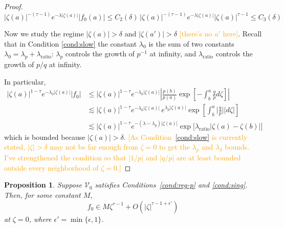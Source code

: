 \documentclass{article}
\theoremstyle{plain}
\newtheorem{prop}{Proposition}
\newcommand{\hardpart}{\mathcal{V}_0}
\newcommand{\solproto}{f_0}
\begin{document}
\begin{proof}
\[   |\zeta(a)|^{-(\tau-1)} e^{-\lambda |\zeta(a)|} |f_0(a)|\leq  C_2(\delta)\, |\zeta(a)|^{-(\tau-1)} e^{-\lambda |\zeta(a)|} |\zeta(a)|^{\tau-1} \leq C_3(\delta)
\]

Now we study the regime $|\zeta(a)|>\delta$ and $|\zeta(a')|>\delta$ \textcolor{orange}{[there's no $a'$ here]}. Recall that in Condition \eqref{cond:slow} the constant $\lambda_0$ is the sum of two constants $\lambda_0=\lambda_p+\lambda_\text{ratio}$: $\lambda_p$ controls the growth of $p^{-1}$ at infinity, and $\lambda_\text{ratio}$ controls the growth of $p/q$ at infinity.

In particular, 
      \begin{align*}
          |\zeta(a)|^{1-\tau} e^{-\lambda_0 |\zeta(a)|} |f_0|&\leq  |\zeta(a)|^{1-\tau} e^{-\lambda_0 |\zeta(a)|} \left\vert\frac{p(b)}{p(a)}\exp\left[-\int_{b}^{a}\frac{q}{p} d\zeta\right]\right\vert \\
          & \lesssim  |\zeta(a)|^{1-\tau} e^{-\lambda_0 |\zeta(a)|}  \, e^{\lambda_p|\zeta(a)|}\exp\left[\int_{b}^{a} \Big\vert\frac{q}{p} \Big\vert |d\zeta| \right]\\
          & \lesssim  |\zeta(a)|^{1-\tau} e^{-(\lambda-\lambda_p) |\zeta(a)|} \exp\Big[\lambda_\text{ratio} |\zeta(a)-\zeta(b)| \Big]
      \end{align*}
   which is bounded because $|\zeta(a)|>\delta$. \textcolor{orange}{[As Condition~\eqref{cond:slow} is currently stated, $|\zeta| > \delta$ may not be far enough from $\zeta = 0$ to get the $\lambda_p$ and $\lambda_\delta$ bounds. I've strengthened the condition so that $|1/p|$ and $|q/p|$ are at least bounded outside every neighborhood of $\zeta = 0$.]}
\end{proof}
\begin{prop}\label{prop:better-proto-estimate}
Suppose $\hardpart$ satisfies {\em Conditions~\eqref{cond:reg-p}} and \eqref{cond:sing}. Then, for some constant $M$,
\[ \solproto \in M\zeta^{\tau-1} + O(|\zeta|^{\tau-1+\epsilon'}) \]
at $\zeta = 0$, where $\epsilon'=\min\{\epsilon, 1\}$.
\end{prop}
\end{document}
